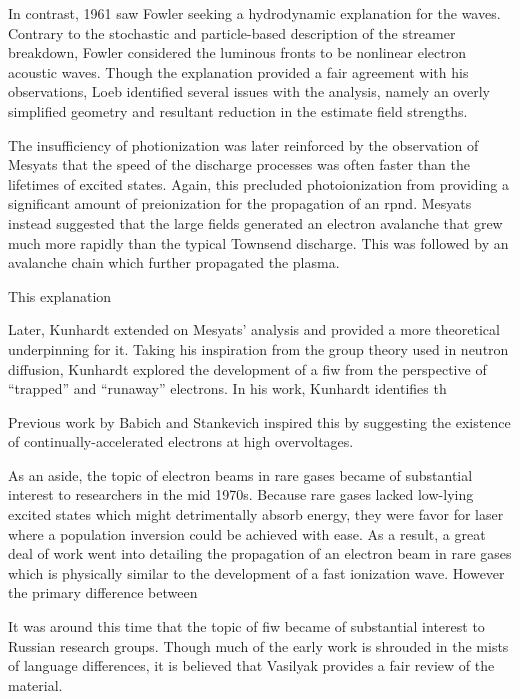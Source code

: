 In contrast, 1961 saw Fowler \cite{Fowler1961} seeking a hydrodynamic
explanation for the waves. Contrary to the stochastic and particle-based
description of the streamer breakdown, Fowler considered the luminous fronts to
be nonlinear electron acoustic waves. Though the explanation provided a fair
agreement with his observations, Loeb \cite{Loeb1965} identified several
issues with the analysis, namely an overly simplified geometry and resultant
reduction in the estimate field strengths.

The insufficiency of photionization was later reinforced by the observation of
Mesyats \cite{Mesyats1972} that the speed of the discharge processes was often
faster than the lifetimes of excited states. Again, this precluded
photoionization from providing a significant amount of preionization for the
propagation of an rpnd. Mesyats instead suggested that the large fields
generated an electron avalanche that grew much more rapidly than the typical
Townsend discharge. This was followed by an avalanche chain which further
propagated the plasma.

This explanation 

Later, Kunhardt \cite{Kunhardt1980} extended on Mesyats' analysis and provided a
more theoretical underpinning for it. Taking his inspiration from the group
theory used in neutron diffusion, Kunhardt explored the development of a fiw
from the perspective of ``trapped'' and ``runaway'' electrons. In his
work, Kunhardt identifies th

Previous work by
Babich and Stankevich \cite{Babich1973} inspired this by suggesting the
existence of continually-accelerated electrons at high overvoltages.

As an aside, the topic of electron beams in rare gases became of substantial
interest to researchers in the mid 1970s. Because rare gases lacked low-lying
excited states which might detrimentally absorb energy, they were favor for
laser where a population inversion could be achieved with ease. As a result, a
great deal of work went into detailing the propagation of an electron beam in
rare gases which is physically similar to the development of a fast ionization
wave. However the primary difference between

It was around this time that the topic of fiw became of substantial interest to
Russian research groups. Though much of the early work is shrouded in the mists
of language differences, it is believed that Vasilyak \cite{Vasilyak1994}
provides a fair review of the material. 

